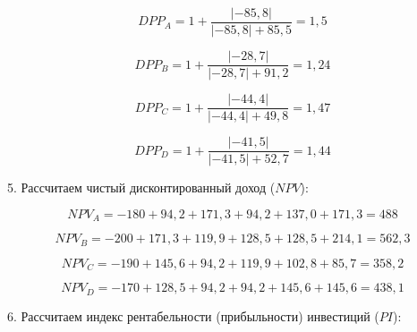 \[ DPP_A =  1 + \dfrac{|-85,8|}{|-85,8| + 85,5} = 1,5\]

\[ DPP_B =  1 + \dfrac{|-28,7|}{|-28,7| + 91,2} = 1,24\]

\[ DPP_C =  1 + \dfrac{|-44,4|}{|-44,4| + 49,8} = 1,47 \]

\[ DPP_D = 1+ \dfrac{|-41,5|}{|-41,5| + 52,7} = 1,44 \]

5. Рассчитаем чистый дисконтированный доход ($NPV$):

\[ NPV_A =  -180 + 94,2  +171,3 + 94,2  + 137,0 + 171,3  = 488\]

\[ NPV_B =-200 +171,3 + 119,9 + 128,5 + 128,5 + 214,1 =562,3\]

\[ NPV_C =  -190+145,6+94,2+119,9+102,8+85,7=358,2\]

\[ NPV_D = -170+128,5+94,2+94,2+145,6+145,6=438,1\]

6. Рассчитаем индекс рентабельности (прибыльности) инвестиций ($PI$):




\begin{table}[]
	\small
	\label{final}
	\caption{Показатели эффективности инвестиционных проектов}
\end{table}

